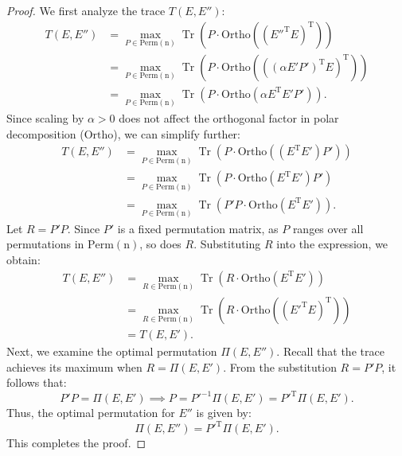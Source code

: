 \documentclass{article} %
\DeclareMathOperator{\Tr}{Tr}
\begin{document}
\begin{proof}
We first analyze the trace $T(E, E'')$:
\[
\begin{aligned}
    T(E, E'') &= \max_{P \in \mathrm{Perm}(\mathrm{n})} \Tr\left(P \cdot \mathrm{Ortho}\left((E''^{\text{T}} E)^{\text{T}}\right)\right) \\
    &= \max_{P \in \mathrm{Perm}(\mathrm{n})} \Tr\left(P \cdot \mathrm{Ortho}\left(((\alpha E' P')^{\text{T}} E)^{\text{T}}\right)\right) \\
    &= \max_{P \in \mathrm{Perm}(\mathrm{n})} \Tr\left(P \cdot \mathrm{Ortho}\left(\alpha E^{\text{T}} E' P'\right)\right).
\end{aligned}
\]
Since scaling by $\alpha > 0$ does not affect the orthogonal factor in polar decomposition ($\mathrm{Ortho}$), we can simplify further:
\[
\begin{aligned}
    T(E, E'') &= \max_{P \in \mathrm{Perm}(\mathrm{n})} \Tr\left(P \cdot \mathrm{Ortho}\left((E^{\text{T}} E') P'\right)\right) \\
    &= \max_{P \in \mathrm{Perm}(\mathrm{n})} \Tr\left(P \cdot \mathrm{Ortho}(E^{\text{T}} E') P'\right) \\
    &= \max_{P \in \mathrm{Perm}(\mathrm{n})} \Tr\left(P' P \cdot \mathrm{Ortho}\left(E^{\text{T}} E'\right)\right).
\end{aligned}
\]
Let $R = P' P$. Since $P'$ is a fixed permutation matrix, as $P$ ranges over all permutations in $\mathrm{Perm}(\mathrm{n})$, so does $R$. Substituting $R$ into the expression, we obtain:
\[
\begin{aligned}
    T(E, E'') &= \max_{R \in \mathrm{Perm}(\mathrm{n})} \Tr\left(R \cdot \mathrm{Ortho}\left(E^{\text{T}} E'\right)\right) \\
    &= \max_{R \in \mathrm{Perm}(\mathrm{n})} \Tr\left(R \cdot \mathrm{Ortho}\left((E'^{\text{T}} E)^{\text{T}}\right)\right) \\
    &= T(E, E').
\end{aligned}
\]
Next, we examine the optimal permutation $\Pi(E, E'')$. Recall that the trace achieves its maximum when $R = \Pi(E, E')$. From the substitution $R = P' P$, it follows that:
\[
P' P = \Pi(E, E') \! \implies \! P = P'^{-1} \Pi(E, E') = P'^{\text{T}} \Pi(E, E').
\]
Thus, the optimal permutation for $E''$ is given by:
\[
\Pi(E, E'') = P'^{\text{T}} \Pi(E, E').
\]
This completes the proof.
\end{proof}
\end{document}
